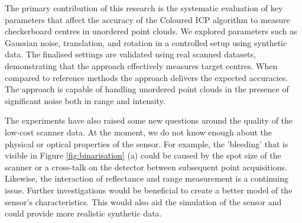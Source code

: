 The primary contribution of this research is the systematic evaluation of key parameters that affect the accuracy of the Coloured ICP algorithm to measure checkerboard centres in unordered point clouds. We explored parameters such as Gaussian noise, translation, and rotation in a controlled setup using synthetic data. The finalised settings are validated using real scanned datasets, demonstrating that the approach effectively measures target centres. When compared to reference methods the approach delivers the expected accuracies. The approach is capable of handling unordered point clouds in the presence of significant noise both in range and intensity.

The experiments have also raised some new questions around the quality of the low-cost scanner data. At the moment, we do not know enough about the physical or optical properties of the sensor. For example, the 'bleeding' that is visible in Figure \ref{fig:binarisation} (a) could be caused by the spot size of the scanner or a cross-talk on the detector between subsequent point acquisitions. Likewise, the interaction of reflectance and range measurement is a continuing issue. Further investigations would be beneficial to create a better model of the sensor's characteristics. This would also aid the simulation of the sensor and could provide more realistic synthetic data.